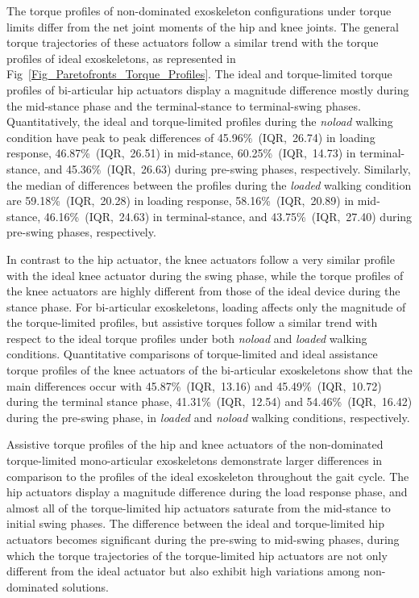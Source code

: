 \documentclass[10pt,letterpaper]{article}
\begin{document}
The torque profiles of non-dominated exoskeleton configurations under torque limits differ from the net joint moments of the hip and knee joints. The general torque trajectories of these actuators follow a similar trend with the torque profiles of ideal exoskeletons, as represented in Fig~\ref{Fig_Paretofronts_Torque_Profiles}. The ideal and torque-limited torque profiles of bi-articular hip actuators display a magnitude difference mostly during the mid-stance phase and the terminal-stance to terminal-swing phases. Quantitatively, the ideal and torque-limited profiles during the \emph{noload} walking condition have peak to peak differences of 45.96\%~(IQR,~26.74) in loading response, 46.87\%~(IQR,~26.51) in mid-stance, 60.25\%~(IQR,~14.73) in terminal-stance, and 45.36\%~(IQR,~26.63) during pre-swing phases, respectively. Similarly, the median of differences between the profiles during the \emph{loaded} walking condition are 59.18\%~(IQR,~20.28) in loading response, 58.16\%~(IQR,~20.89) in mid-stance, 46.16\%~(IQR,~24.63) in terminal-stance, and 43.75\%~(IQR,~27.40) during pre-swing phases, respectively.

In contrast to the hip actuator, the knee actuators follow a very similar profile with the ideal knee actuator during the swing phase, while the torque profiles of the knee actuators are highly different from those of the ideal device during the stance phase. For bi-articular exoskeletons, loading  affects only the magnitude of the torque-limited profiles, but assistive torques follow a similar trend with respect to the ideal torque profiles under both \emph{noload} and \emph{loaded} walking conditions. Quantitative comparisons of torque-limited and ideal assistance torque profiles of the knee actuators of the bi-articular exoskeletons show that the main differences occur with 45.87\%~(IQR,~13.16) and 45.49\%~(IQR,~10.72) during the terminal stance phase, 41.31\%~(IQR,~12.54) and  54.46\%~(IQR,~16.42) during the pre-swing phase,  in \emph{loaded} and \emph{noload} walking conditions, respectively.

Assistive torque profiles of the hip and knee actuators of the non-dominated torque-limited mono-articular exoskeletons demonstrate larger differences in comparison to the profiles of the ideal exoskeleton throughout the gait cycle. The hip actuators display a magnitude difference during the load response phase, and almost all of the torque-limited hip actuators saturate from the mid-stance to initial swing phases. The difference between the ideal and torque-limited hip actuators becomes significant during the pre-swing to mid-swing phases, during which the torque trajectories of the torque-limited hip actuators are not only different from the ideal actuator but also exhibit high variations among non-dominated solutions.
\end{document}
